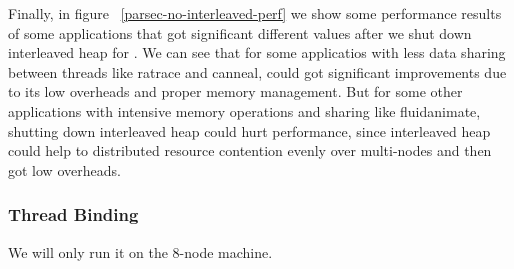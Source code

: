 Finally, in figure ~\ref{parsec-no-interleaved-perf} we show some performance results of some applications that got significant different values after we shut down interleaved heap for \NM{}. We can see that for some applicatios with less data sharing between threads like ratrace and canneal, \NM{} could got significant improvements due to its low overheads and proper memory management. But for some other applications with intensive memory operations and sharing like fluidanimate, shutting down interleaved heap could hurt performance, since interleaved heap could help to distributed resource contention evenly over multi-nodes and then got low overheads.

\subsubsection{Thread Binding}
\label{sec: threadbinding}
We will only run it on the 8-node machine. 

